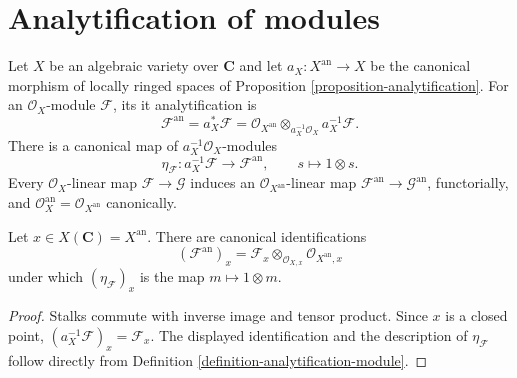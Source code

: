 
\section{Analytification of modules}
\label{section-analytification-modules}

\begin{definition}
\label{definition-analytification-module}
\begin{reference}
\cite[\S 3, no. 9, Definition 2]{GAGA}
\end{reference}
Let $X$ be an algebraic variety over $\mathbf C$ and let
$a_X:X^{\mathrm{an}}\to X$ be the canonical morphism of locally ringed
spaces of Proposition \ref{proposition-analytification}. For an
$\mathcal O_X$-module $\mathcal F$, its {it analytification} is
$$
\mathcal F^{\mathrm{an}}=a_X^*\mathcal F
=\mathcal O_{X^{\mathrm{an}}}
\otimes_{a_X^{-1}\mathcal O_X}a_X^{-1}\mathcal F.
$$
There is a canonical map of $a_X^{-1}\mathcal O_X$-modules
$$
\eta_{\mathcal F}:a_X^{-1}\mathcal F\longrightarrow
\mathcal F^{\mathrm{an}},\qquad s\longmapsto1\otimes s.
$$
Every $\mathcal O_X$-linear map $\mathcal F\to\mathcal G$ induces an
$\mathcal O_{X^{\mathrm{an}}}$-linear map
$\mathcal F^{\mathrm{an}}\to\mathcal G^{\mathrm{an}}$, functorially, and
$\mathcal O_X^{\mathrm{an}}=\mathcal O_{X^{\mathrm{an}}}$ canonically.
\end{definition}

\begin{lemma}
\label{lemma-analytification-module-stalks}
Let $x\in X(\mathbf C)=X^{\mathrm{an}}$. There are canonical identifications
$$
(\mathcal F^{\mathrm{an}})_x
=\mathcal F_x\otimes_{\mathcal O_{X,x}}
\mathcal O_{X^{\mathrm{an}},x}
$$
under which $(\eta_{\mathcal F})_x$ is the map $m\mapsto1\otimes m$.
\end{lemma}

\begin{proof}
Stalks commute with inverse image and tensor product. Since $x$ is a closed
point, $(a_X^{-1}\mathcal F)_x=\mathcal F_x$. The displayed identification
and the description of $\eta_{\mathcal F}$ follow directly from Definition
\ref{definition-analytification-module}.
\end{proof}

